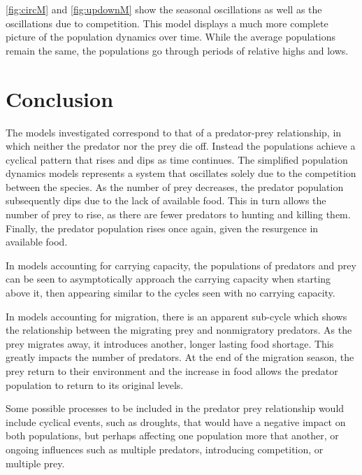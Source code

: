 \documentclass[12pt]{article}   %
\theoremstyle{definition}
\numberwithin{equation}{section}
\begin{document}
\quad \autoref{fig:circM} and  \autoref{fig:updownM} show the seasonal oscillations as well as the oscillations due to competition. This model displays a much more complete picture of the population dynamics over time. While the average populations remain the same, the populations go through periods of relative highs and lows.   

\newpage
\setcounter{page}{10}
\section{Conclusion} \label{APPM2360proj01sec01}

\quad The models investigated correspond to that of a predator-prey relationship, in which neither the predator nor the prey die off. Instead the populations achieve a cyclical pattern that rises and dips as time continues. The simplified population dynamics models represents a system that oscillates solely due to the competition between the species. As the number of prey decreases, the predator population subsequently dips due to the lack of available food. This in turn allows the number of prey to rise, as there are fewer predators to hunting and killing them. Finally, the predator population rises once again, given the resurgence in available food.

\quad In models accounting for carrying capacity, the populations of predators and prey can be seen to asymptotically approach the carrying capacity when starting above it, then appearing similar to the cycles seen with no carrying capacity.

\quad In models accounting for migration, there is an apparent sub-cycle which shows the relationship between the migrating prey and nonmigratory predators. As the prey migrates away, it introduces another, longer lasting food shortage. This greatly impacts the number of predators. At the end of the migration season,  the prey return to their environment and the increase in food allows the predator population to return to its original levels. 

\quad Some possible processes to be included in the predator prey relationship would include cyclical events, such as droughts, that would have a negative impact on both populations, but perhaps affecting one population more that another, or ongoing influences such as multiple predators, introducing competition, or multiple prey.
\end{document}
